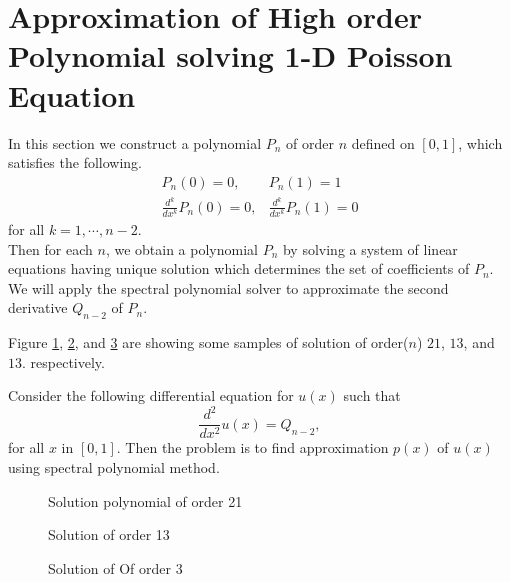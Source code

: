 \section {Approximation of High order Polynomial solving
                                                1-D Poisson Equation}

In this section we construct a polynomial $P_n$ of order $n$
defined on $[0,1]$, which satisfies the following.
\begin{eqnarray*}
 P_n(0) = 0, &P_n(1) = 1 \\
 \frac{d^k}{dx^k}P_n(0) = 0, &\frac{d^k}{dx^k}P_n(1) = 0
\end{eqnarray*}
for all $k = 1, \cdots, n-2$. \\
Then for each $n$, we obtain a polynomial $P_n$ by solving a
system of linear equations having unique solution which determines
the set of coefficients of $P_n$. We will apply the spectral
polynomial solver to approximate the second derivative $Q_{n-2}$
of $P_n$.

Figure \ref{sol1}, \ref{sol2}, and \ref{sol3} are showing some
samples of solution of order($n$) $21$, $13$, and $13$.
respectively.

\begin{problem}
\label{problem2}Consider the following differential equation for
$u(x)$ such that
\begin{equation*}
    \frac{d^2}{dx^2} u(x) = Q_{n-2},
\end{equation*}
for all $x$ in $[0, 1]$. Then the problem is to find approximation
$p(x)$ of $u(x)$ using spectral polynomial method.
\end{problem}

\noindent
\begin{figure}
  \centering%
  \caption{\label{sol1}Solution polynomial of order 21}
\end{figure}

\begin{figure}
  \centering%
  \caption{\label{sol2}Solution of order 13}
\end{figure}

\begin{figure}
  \centering%
  \caption{\label{sol3}Solution of Of order 3}
\end{figure}

